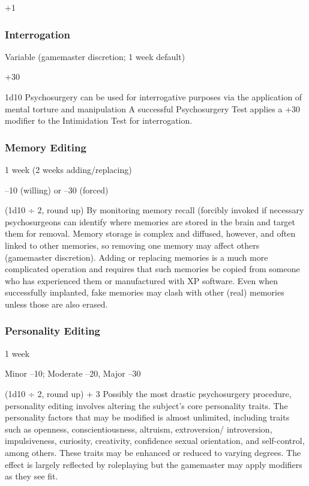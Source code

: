 +1

\subsubsection{Interrogation}


Variable (gamemaster discretion; 1 week default)

+30

1d10
Psychosurgery can be used for interrogative purposes 
via the application of mental torture and manipulation
A successful Psychosurgery Test applies a +30
modifier to the Intimidation Test for interrogation.

\subsubsection{Memory Editing}


1 week (2 weeks adding/replacing)

–10 (willing) or –30 (forced)

(1d10 ÷ 2, round up)
By monitoring memory recall (forcibly invoked if necessary
psychosurgeons can identify where memories
are stored in the brain and target them for removal. 
Memory storage is complex and diffused, however, 
and often linked to other memories, so removing one 
memory may affect others (gamemaster discretion).
Adding or replacing memories is a much more complicated
operation and requires that such memories be
copied from someone who has experienced them or 
manufactured with XP software. Even when successfully
implanted, fake memories may clash with other
(real) memories unless those are also erased.

\subsubsection{Personality Editing}


1 week

Minor –10; Moderate –20, Major –30

(1d10 ÷ 2, round up) + 3
Possibly the most drastic psychosurgery procedure, 
personality editing involves altering the subject's core 
personality traits. The personality factors that may be 
modified is almost unlimited, including traits such as 
openness, conscientiousness, altruism, extroversion/
introversion, impulsiveness, curiosity, creativity, confidence
sexual orientation, and self-control, among
others. These traits may be enhanced or reduced to 
varying degrees. The effect is largely reflected by roleplaying
but the gamemaster may apply modifiers as
they see fit.

